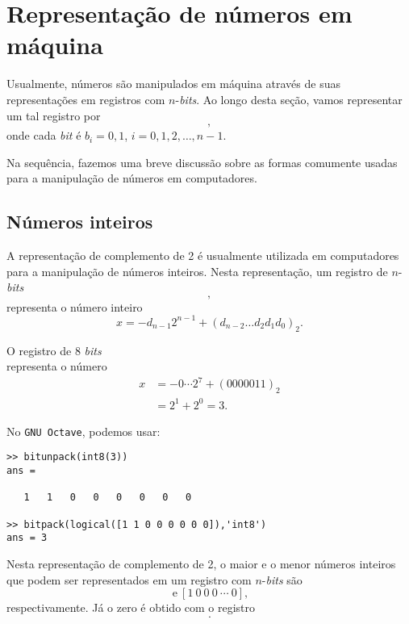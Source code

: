 \section{Representação de números em máquina}\label{cap_artm_sec_repummaq}

Usualmente, números são manipulados em máquina através de suas representações em registros com $n$-{\it bits}. Ao longo desta seção, vamos representar um tal registro por
\begin{equation}
  [b_0 ~ b_1 ~ b_2 ~ \cdots ~ b_{n-1}],
\end{equation}
onde cada {\it bit} é $b_i=0, 1$, $i=0, 1, 2, \dotsc, n-1$.

Na sequência, fazemos uma breve discussão sobre as formas comumente usadas para a manipulação de números em computadores.

\subsection{Números inteiros}

A representação de complemento de 2 é usualmente utilizada em computadores para a manipulação de números inteiros. Nesta representação, um registro de $n$-{\it bits}
\begin{equation}
  [b_0 ~ b_1 ~ b_2 ~ \cdots ~ b_{n-1}],
\end{equation}
representa o número inteiro
\begin{equation}
  x = -d_{n-1}2^{n-1} + (d_{n-2}\ldots d_2d_1d_0)_2.
\end{equation}

\begin{ex}
  O registro de 8 {\it bits}
  \begin{equation}
    [1 ~ 1 ~ 0 ~ 0 ~ 0 ~ 0 ~ 0 ~ 0]
  \end{equation}
representa o número
\begin{align}
  x &= -0\cdots 2^{7} + (0000011)_2\\
  &= 2^1 + 2^0 = 3.
\end{align}

\ifisoctave
No \verb+GNU Octave+, podemos usar:
\begin{verbatim}
>> bitunpack(int8(3))
ans =

   1   1   0   0   0   0   0   0

>> bitpack(logical([1 1 0 0 0 0 0 0]),'int8')
ans = 3
\end{verbatim}
\fi
\end{ex}

Nesta representação de complemento de 2, o maior e o menor números inteiros que podem ser representados em um registro com $n$-{\it bits} são
\begin{equation}
  [1 ~ 1 ~ 1 ~ \cdots ~ 1 ~ 0] ~ \text{e} ~ [1 ~ 0 ~ 0 ~ 0 ~ \cdots ~ 0],
\end{equation}
respectivamente. Já o zero é obtido com o registro
\begin{equation}
  [0 ~ 0 ~ 0 ~ 0 ~ 0 ~ 0 ~ 0 ~ 0].
\end{equation}


